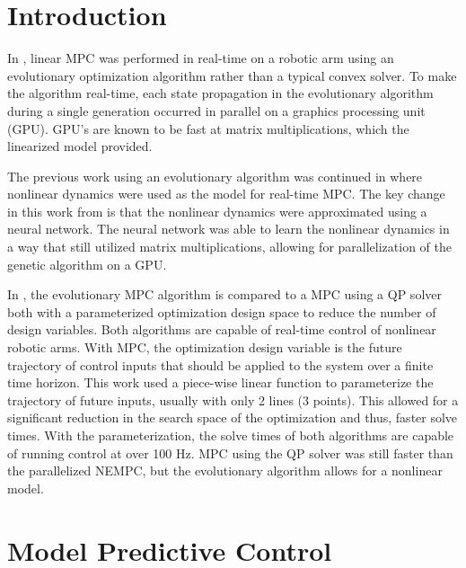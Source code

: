 \documentclass[letterpaper, 10 pt, conference]{ieeeconf}  %
\begin{document}


\section{Introduction}

In \cite{hyatt2017real}, linear MPC was performed in real-time on a robotic arm using an evolutionary optimization algorithm rather than a typical convex solver. To make the algorithm real-time, each state propagation in the evolutionary algorithm during a single generation occurred in parallel on a graphics processing unit (GPU). GPU's are known to be fast at matrix multiplications, which the linearized model provided.

The previous work using an evolutionary algorithm was continued in \cite{hyatt2019real} where nonlinear dynamics were used as the model for real-time MPC. The key change in this work from \cite{hyatt2017real} is that the nonlinear dynamics were approximated using a neural network. The neural network was able to learn the nonlinear dynamics in a way that still utilized matrix multiplications, allowing for parallelization of the genetic algorithm on a GPU.

In \cite{hyatt2020parameterized}, the evolutionary MPC algorithm is compared to a MPC using a QP solver both with a parameterized optimization design space to reduce the number of design variables. Both algorithms are capable of real-time control of nonlinear robotic arms. With MPC, the optimization design variable is the future trajectory of control inputs that should be applied to the system over a finite time horizon. This work used a piece-wise linear function to parameterize the trajectory of future inputs, usually with only 2 lines (3 points). This allowed for a significant reduction in the search space of the optimization and thus, faster solve times. With the parameterization, the solve times of both algorithms are capable of running control at over 100 Hz. MPC using the QP solver was still faster than the parallelized NEMPC, but the evolutionary algorithm allows for a nonlinear model.

\section{Model Predictive Control}
\end{document}
